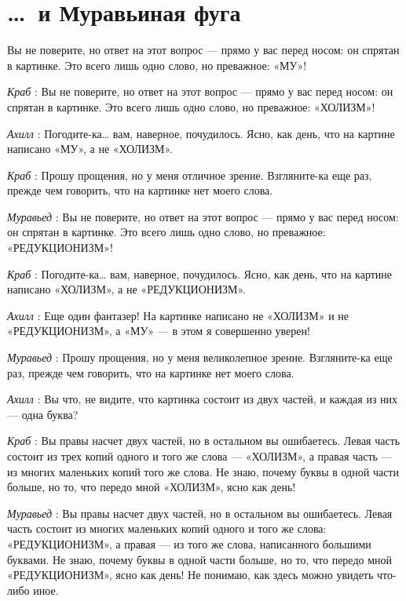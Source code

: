 \documentclass[../main.tex]{subfiles}
\begin{document}
\section{\ldots~и Муравьиная фуга}


\begin{dialogue}

 Вы не поверите, но ответ на этот вопрос --- прямо у вас перед носом: он спрятан в картинке. Это всего лишь одно слово, но преважное: «МУ»!

\emph{Краб} : Вы не поверите, но ответ на этот вопрос --- прямо у вас перед носом: он спрятан в картинке. Это всего лишь одно слово, но преважное: «ХОЛИЗМ»!

\emph{Ахилл} : Погодите-ка\ldots{} вам, наверное, почудилось. Ясно, как день, что на картине написано «МУ», а не «ХОЛИЗМ».

\emph{Краб} : Прошу прощения, но у меня отличное зрение. Взгляните-ка еще раз, прежде чем говорить, что на картинке нет моего слова.

\emph{Муравьед} : Вы не поверите, но ответ на этот вопрос --- прямо у вас перед носом: он спрятан в картинке. Это всего лишь одно слово, но преважное: «РЕДУКЦИОНИЗМ»!

\emph{Краб} : Погодите-ка\ldots{} вам, наверное, почудилось. Ясно, как день, что на картине написано «ХОЛИЗМ», а не «РЕДУКЦИОНИЗМ».

\emph{Ахилл} : Еще один фантазер! На картинке написано не «ХОЛИЗМ» и не «РЕДУКЦИОНИЗМ», а «МУ» --- в этом я совершенно уверен!

\emph{Муравьед} : Прошу прощения, но у меня великолепное зрение. Взгляните-ка еще раз, прежде чем говорить, что на картинке нет моего слова.

\emph{Ахилл} : Вы что, не видите, что картинка состоит из двух частей, и каждая из них --- одна буква?

\emph{Краб} : Вы правы насчет двух частей, но в остальном вы ошибаетесь. Левая часть состоит из трех копий одного и того же слова --- «ХОЛИЗМ», а правая часть --- из многих маленьких копий того же слова. Не знаю, почему буквы в одной части больше, но то, что передо мной «ХОЛИЗМ», ясно как день!

\emph{Муравьед} : Вы правы насчет двух частей, но в остальном вы ошибаетесь. Левая часть состоит из многих маленьких копий одного и того же слова: «РЕДУКЦИОНИЗМ», а правая --- из того же слова, написанного большими буквами. Не знаю, почему буквы в одной части больше, но то, что передо мной «РЕДУКЦИОНИЗМ», ясно как день! Не понимаю, как здесь можно увидеть что-либо иное.


\end{dialogue}
\end{document}
